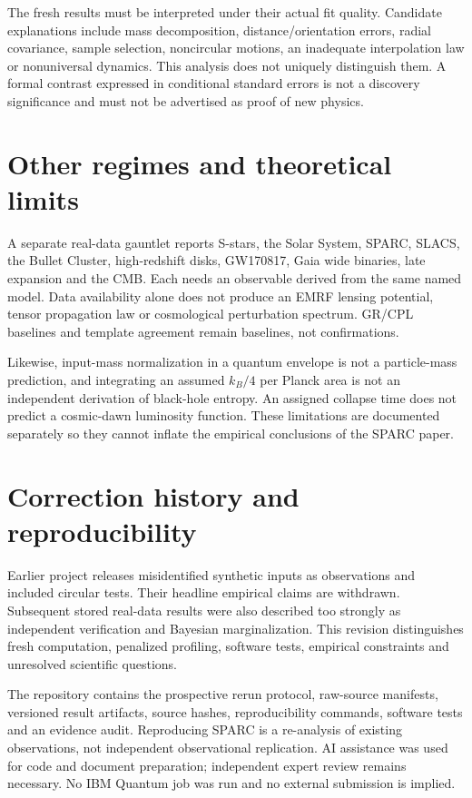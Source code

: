\documentclass[11pt]{article}
\begin{document}
The fresh results must be interpreted under their actual fit quality. Candidate explanations include mass decomposition, distance/orientation errors, radial covariance, sample selection, noncircular motions, an inadequate interpolation law or nonuniversal dynamics. This analysis does not uniquely distinguish them. A formal contrast expressed in conditional standard errors is not a discovery significance and must not be advertised as proof of new physics.

\section{Other regimes and theoretical limits}
A separate real-data gauntlet reports S-stars, the Solar System, SPARC, SLACS, the Bullet Cluster, high-redshift disks, GW170817, Gaia wide binaries, late expansion and the CMB. Each needs an observable derived from the same named model. Data availability alone does not produce an EMRF lensing potential, tensor propagation law or cosmological perturbation spectrum. GR/CPL baselines and template agreement remain baselines, not confirmations.

Likewise, input-mass normalization in a quantum envelope is not a particle-mass prediction, and integrating an assumed $k_B/4$ per Planck area is not an independent derivation of black-hole entropy. An assigned collapse time does not predict a cosmic-dawn luminosity function. These limitations are documented separately so they cannot inflate the empirical conclusions of the SPARC paper.

\section{Correction history and reproducibility}
Earlier project releases misidentified synthetic inputs as observations and included circular tests. Their headline empirical claims are withdrawn. Subsequent stored real-data results were also described too strongly as independent verification and Bayesian marginalization. This revision distinguishes fresh computation, penalized profiling, software tests, empirical constraints and unresolved scientific questions.

The repository contains the prospective rerun protocol, raw-source manifests, versioned result artifacts, source hashes, reproducibility commands, software tests and an evidence audit. Reproducing SPARC is a re-analysis of existing observations, not independent observational replication. AI assistance was used for code and document preparation; independent expert review remains necessary. No IBM Quantum job was run and no external submission is implied.
\end{document}
